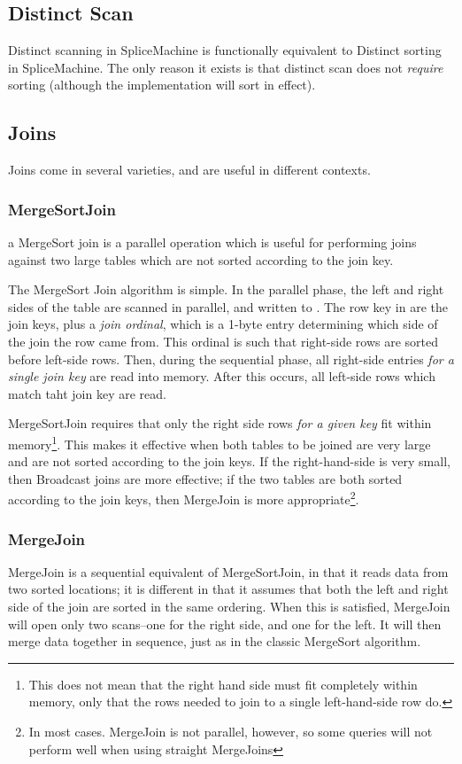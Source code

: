 \subsection{Distinct Scan}
Distinct scanning in SpliceMachine is functionally equivalent to Distinct sorting in SpliceMachine. The only reason it exists is that distinct scan does not \emph{require} sorting (although the implementation will sort in effect).

\subsection{Joins}
Joins come in several varieties, and are useful in different contexts.
\subsubsection{MergeSortJoin}
a MergeSort join is a parallel operation which is useful for performing joins against two large tables which are not sorted according to the join key.

The MergeSort Join algorithm is simple. In the parallel phase, the left and right sides of the table are scanned in parallel, and written to \temp. The row key in \temp are the join keys, plus a \emph{join ordinal}, which is a 1-byte entry determining which side of the join the row came from. This ordinal is such that right-side rows are sorted before left-side rows. Then, during the sequential phase, all right-side entries \emph{for a single join key} are read into memory. After this occurs, all left-side rows which match taht join key are read.

MergeSortJoin requires that only the right side rows \emph{for a given key} fit within memory\footnote{This does not mean that the right hand side must fit completely within memory, only that the rows needed to join to a single left-hand-side row do.}. This makes it effective when both tables to be joined are very large and are not sorted according to the join keys. If the right-hand-side is very small, then Broadcast joins are more effective; if the two tables are both sorted according to the join keys, then MergeJoin is more appropriate\footnote{In most cases. MergeJoin is not parallel, however, so some queries will not perform well when using straight MergeJoins}.

\subsubsection{MergeJoin}
MergeJoin is a sequential equivalent of MergeSortJoin, in that it reads data from two sorted locations; it is different in that it assumes that both the left and right side of the join are sorted in the same ordering. When this is satisfied, MergeJoin will open only two scans--one for the right side, and one for the left. It will then merge data together in sequence, just as in the classic MergeSort algorithm.

